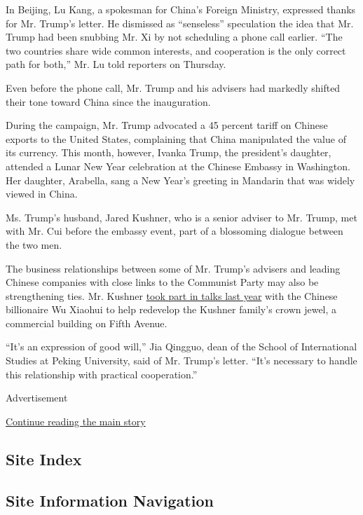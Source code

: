 In Beijing, Lu Kang, a spokesman for China's Foreign Ministry, expressed
thanks for Mr. Trump's letter. He dismissed as ``senseless'' speculation
the idea that Mr. Trump had been snubbing Mr. Xi by not scheduling a
phone call earlier. ``The two countries share wide common interests, and
cooperation is the only correct path for both,'' Mr. Lu told reporters
on Thursday.

Even before the phone call, Mr. Trump and his advisers had markedly
shifted their tone toward China since the inauguration.

During the campaign, Mr. Trump advocated a 45 percent tariff on Chinese
exports to the United States, complaining that China manipulated the
value of its currency. This month, however, Ivanka Trump, the
president's daughter, attended a Lunar New Year celebration at the
Chinese Embassy in Washington. Her daughter, Arabella, sang a New Year's
greeting in Mandarin that was widely viewed in China.

Ms. Trump's husband, Jared Kushner, who is a senior adviser to Mr.
Trump, met with Mr. Cui before the embassy event, part of a blossoming
dialogue between the two men.

The business relationships between some of Mr. Trump's advisers and
leading Chinese companies with close links to the Communist Party may
also be strengthening ties. Mr. Kushner
\href{https://www.nytimes.com/2017/01/07/us/politics/jared-kushner-trump-business.html}{took
part in talks last year} with the Chinese billionaire Wu Xiaohui to help
redevelop the Kushner family's crown jewel, a commercial building on
Fifth Avenue.

``It's an expression of good will,'' Jia Qingguo, dean of the School of
International Studies at Peking University, said of Mr. Trump's letter.
``It's necessary to handle this relationship with practical
cooperation.''

Advertisement

\protect\hyperlink{after-bottom}{Continue reading the main story}

\hypertarget{site-index}{%
\subsection{Site Index}\label{site-index}}

\hypertarget{site-information-navigation}{%
\subsection{Site Information
Navigation}\label{site-information-navigation}}

